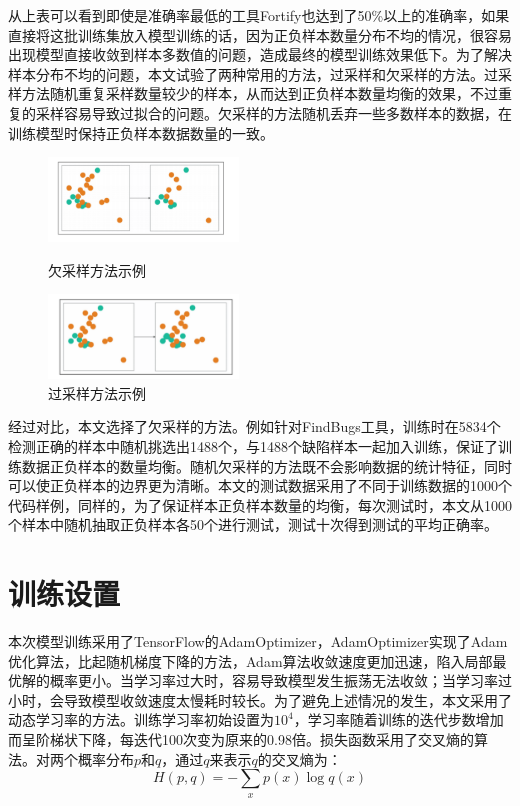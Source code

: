 从上表可以看到即使是准确率最低的工具Fortify也达到了50\%以上的准确率，如果直接将这批训练集放入模型训练的话，因为正负样本数量分布不均的情况，很容易出现模型直接收敛到样本多数值的问题，造成最终的模型训练效果低下。为了解决样本分布不均的问题，本文试验了两种常用的方法，过采样和欠采样的方法。过采样方法随机重复采样数量较少的样本，从而达到正负样本数量均衡的效果，不过重复的采样容易导致过拟合的问题。欠采样的方法随机丢弃一些多数样本的数据，在训练模型时保持正负样本数据数量的一致。
\begin{figure}[h]
	\parbox[h]{.5\textwidth}{\centering
		\includegraphics[width=0.45\textwidth]{figures/7.pdf}
		\caption{欠采样方法示例}}
	\parbox[h]{.5\textwidth}{\centering
		\includegraphics[width=0.45\textwidth]{figures/8.pdf}
		\caption{过采样方法示例}}
\end{figure}

经过对比，本文选择了欠采样的方法。例如针对FindBugs工具，训练时在5834个检测正确的样本中随机挑选出1488个，与1488个缺陷样本一起加入训练，保证了训练数据正负样本的数量均衡。随机欠采样的方法既不会影响数据的统计特征，同时可以使正负样本的边界更为清晰。本文的测试数据采用了不同于训练数据的1000个代码样例，同样的，为了保证样本正负样本数量的均衡，每次测试时，本文从1000个样本中随机抽取正负样本各50个进行测试，测试十次得到测试的平均正确率。

\section{训练设置}
本次模型训练采用了TensorFlow的AdamOptimizer，AdamOptimizer实现了Adam优化算法，比起随机梯度下降的方法，Adam算法收敛速度更加迅速，陷入局部最优解的概率更小。当学习率过大时，容易导致模型发生振荡无法收敛；当学习率过小时，会导致模型收敛速度太慢耗时较长。为了避免上述情况的发生，本文采用了动态学习率的方法。训练学习率初始设置为$10^{4}$，学习率随着训练的迭代步数增加而呈阶梯状下降，每迭代100次变为原来的0.98倍。损失函数采用了交叉熵的算法。对两个概率分布$p$和$q$，通过$q$来表示$q$的交叉熵为：
$$H(p,q) = -\sum_x p(x)\log q(x)$$

